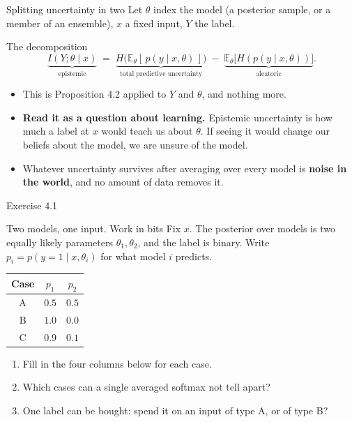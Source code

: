\documentclass[aspectratio=169,9pt]{beamer}
\newcommand{\orange}[1]{\textcolor{AmazonOrange}{\textbf{#1}}}
\newcommand{\blue}[1]{\textcolor{densityblue}{\textbf{#1}}}
\newcommand{\E}{\mathbb{E}}
\begin{document}
\begin{frame}{Splitting uncertainty in two}
Let $\theta$ index the model (a posterior sample, or a member of an ensemble), $x$ a fixed input, $Y$ the label.
\vspace{0.1cm}
\pause
\begin{block}{The decomposition}
\[
    \underbrace{I(Y;\theta \mid x)}_{\text{epistemic}}
    \;=\; \underbrace{H\big(\E_{\theta}[\,p(y \mid x,\theta)\,]\big)}_{\text{total predictive uncertainty}}
    \;-\; \underbrace{\E_{\theta}\big[H(p(y \mid x,\theta))\big]}_{\text{aleatoric}} .
\]
\end{block}
\pause
\vspace{0.1cm}
\begin{itemize}
    \item This is Proposition 4.2 applied to $Y$ and $\theta$, and nothing more.
    \pause
    \item \orange{Read it as a question about learning.} Epistemic uncertainty is how much a label at $x$ would
    teach us about $\theta$. If seeing it would change our beliefs about the model, we are unsure of the model.
    \pause
    \item Whatever uncertainty survives after averaging over every model is \blue{noise in the world}, and no
    amount of data removes it.
\end{itemize}
\end{frame}

\begin{frame}{Exercise 4.1}
\begin{exampleblock}{Two models, one input. Work in bits}
Fix $x$. The posterior over models is two equally likely parameters $\theta_1, \theta_2$, and the label is
binary. Write $p_i = p(y{=}1 \mid x, \theta_i)$ for what model $i$ predicts.
\vspace{0.1cm}
\begin{center}
\footnotesize
\begin{tabular}{ccc}
\toprule
\textbf{Case} & $p_1$ & $p_2$ \\
\midrule
A & $0.5$ & $0.5$ \\
B & $1.0$ & $0.0$ \\
C & $0.9$ & $0.1$ \\
\bottomrule
\end{tabular}
\end{center}
\vspace{0.05cm}
\begin{enumerate}
    \item Fill in the four columns below for each case.
    \item Which cases can a single averaged softmax not tell apart?
    \item One label can be bought: spend it on an input of type A, or of type B?
\end{enumerate}
\end{exampleblock}
\end{frame}
\end{document}
